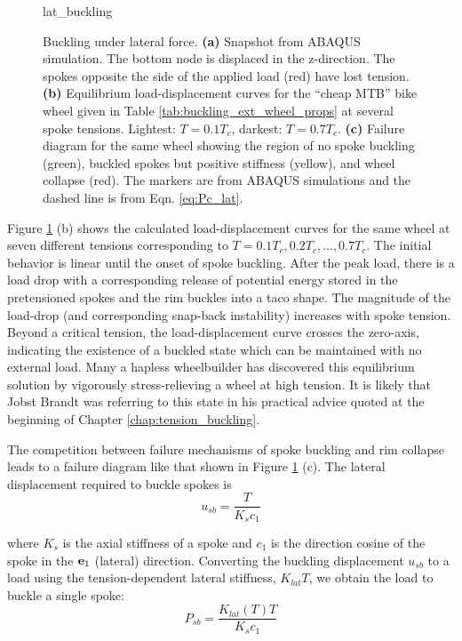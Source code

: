 \documentclass[\rootdir/thesis.tex]{subfiles}
\begin{document}
\begin{figure}
\centering
{lat_buckling} 
\caption{Buckling under lateral force. \textbf{(a)} Snapshot from ABAQUS simulation. The bottom node is displaced in the z-direction. The spokes opposite the side of the applied load (red) have lost tension. \textbf{(b)} Equilibrium load-displacement curves for the ``cheap MTB'' bike wheel given in Table \ref{tab:buckling_ext_wheel_props} at several spoke tensions. Lightest: $T=0.1T_c$, darkest: $T=0.7T_c$. \textbf{(c)} Failure diagram for the same wheel showing the region of no spoke buckling (green), buckled spokes but positive stiffness (yellow), and wheel collapse (red). The markers are from ABAQUS simulations and the dashed line is from Eqn. \eqref{eq:Pc_lat}.}
\label{fig:lat_buckling}
\end{figure}

Figure \ref{fig:lat_buckling} (b) shows the calculated load-displacement curves for the same wheel at seven different tensions corresponding to $T=0.1T_c, 0.2T_c,...,0.7T_c$. The initial behavior is linear until the onset of spoke buckling. After the peak load, there is a load drop with a corresponding release of potential energy stored in the pretensioned spokes and the rim buckles into a taco shape. The magnitude of the load-drop (and corresponding snap-back instability) increases with spoke tension. Beyond a critical tension, the load-displacement curve crosses the zero-axis, indicating the existence of a buckled state which can be maintained with no external load. Many a hapless wheelbuilder has discovered this equilibrium solution by vigorously stress-relieving a wheel at high tension. It is likely that Jobst Brandt was referring to this state in his practical advice quoted at the beginning of Chapter \ref{chap:tension_buckling}.

The competition between failure mechanisms of spoke buckling and rim collapse leads to a failure diagram like that shown in Figure \ref{fig:lat_buckling} (c). The lateral displacement required to buckle spokes is
\begin{equation}
u_{sb} = \frac{T}{K_s c_1}
\end{equation}

where $K_s$ is the axial stiffness of a spoke and $c_1$ is the direction cosine of the spoke in the $\mathbf{e}_1$ (lateral) direction. Converting the buckling displacement $u_{sb}$ to a load using the tension-dependent lateral stiffness, $K_{lat}{T}$, we obtain the load to buckle a single spoke:
\begin{equation}
\label{eq:Pc_lat}
P_{sb} = \frac{K_{lat}(T) T}{K_s c_1}
\end{equation}
\end{document}
